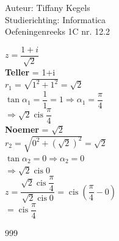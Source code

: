 \documentclass[a4paper]{article}
\begin{document}
  
\noindent \large Auteur: Tiffany Kegels \\
\noindent \large Studierichting: Informatica\\
\noindent \large Oefeningenreeks 1C nr. 12.2\\

\medskip

\normalsize

$z = \dfrac{1+i}{\sqrt{2}}$\\

\textbf{Teller} = 1+i\\

$r_1 = \sqrt{1^2 + 1^2} = \sqrt{2}$\\

$\tan \alpha_1 = \dfrac{1}{1} = 1 \Rightarrow \alpha_1 = \dfrac{\pi}{4}$\\

$\Rightarrow \sqrt{2} \operatorname{cis} \dfrac{\pi}{4}$\\

\textbf{Noemer} = $\sqrt{2}$\\

$r_2 = \sqrt{0^2 + (\sqrt{2})^2} = \sqrt{2}$\\

$\tan \alpha_2 = 0 \Rightarrow \alpha_2 = 0$\\

$\Rightarrow \sqrt{2} \operatorname{cis} 0$\\

$z = \dfrac{\sqrt{2} \operatorname{cis} \dfrac{\pi}{4}}{\sqrt{2} \operatorname{cis} 0} = \operatorname{cis} \left( \dfrac{\pi}{4} - 0 \right)$\\

$=\operatorname{cis} \dfrac{\pi}{4}$\\

\begin{thebibliography}{999}

\end{thebibliography}
\end{document}
